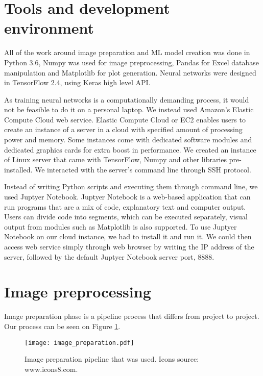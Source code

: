 \section{ Tools and development environment}

All of the work around image preparation and ML model creation was done in Python 3.6,
Numpy was used for image preprocessing, Pandas for Excel database manipulation and Matplotlib for plot generation.
Neural networks were designed in TensorFlow 2.4, using Keras high level API.

As training neural networks is a computationally demanding process, it would not be feasible to do it on a personal laptop.
We instead used Amazon's Elastic Compute Cloud web service.
Elastic Compute Cloud or EC2 enables users to create an instance of a server in a cloud with specified amount of processing power and memory.
Some instances come with dedicated software modules and dedicated graphics cards for extra boost in performance.
We created an instance of Linux server that came with TensorFlow, Numpy and other libraries pre-installed.
We interacted with the server's command line through SSH protocol.

Instead of writing Python scripts and executing them through command line, we used Juptyer Notebook. 
Juptyer Notebook is a web-based application that can run programs that are a mix of code, explanatory text and computer output.
Users can divide code into segments, which can be executed separately, visual output from modules such as Matplotlib is also supported.
To use Juptyer Notebook on our cloud instance, we had to install it and run it.
We could then access web service simply through web browser by writing the IP address of the server, followed by the default Juptyer Notebook server port, 8888.


\section{ Image preprocessing}

Image preparation phase is a pipeline process that differs from project to project.
Our process can be seen on Figure \ref{image_preparation}.

\begin{figure}[ht]
    \centering
    \texttt{[image: image\_preparation.pdf]} 
    \caption{Image preparation pipeline that was used. Icons source: www.icons8.com.}
    \label{image_preparation}
\end{figure}

